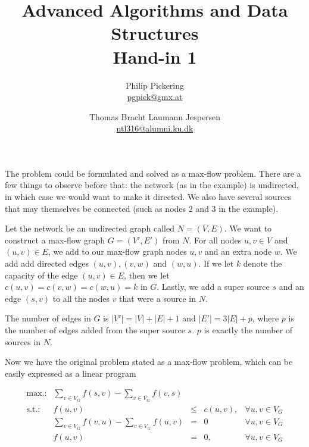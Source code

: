 \documentclass{article}
\author{Philip Pickering\\\url{pgpick@gmx.at} \and Thomas Bracht Laumann Jespersen\\\url{ntl316@alumni.ku.dk}}
\title{Advanced Algorithms and Data Structures\\Hand-in 1}
\date{}
\begin{document}
\maketitle

The problem could be formulated and solved as a max-flow
problem. There are a few things to observe before that: the network
(as in the example) is undirected, in which case we would want to make
it directed. We also have several sources that may themselves be
connected (such as nodes 2 and 3 in the example).


Let the network be an undirected graph called $N = (V,E)$. We want to
construct a max-flow graph $G = (V',E')$ from $N$. For all nodes
$u,v\in V$ and $(u,v)\in E$, we add to our max-flow 
graph nodes $u, v$ and an extra node $w$. We add add directed edges
$(u,v), (v,w)$ and $(w,u)$. If we let $k$ denote the capacity of the
edge $(u,v)\in E$, then we let $c(u,v) = c(v,w) = c(w,u) = k$ in
$G$. Lastly, we add a super source $s$ and an edge $(s,v)$ to all the
nodes $v$ that were a source in $N$.

The number of edges in $G$ is $|V'| = |V| + |E| + 1 $ and $|E'| = 3|E|
+ p$, where $p$ is the number of edges added from the super source
$s$. $p$ is exactly the number of sources in $N$.

Now we have the original problem stated as a max-flow problem, which
can be easily expressed as a linear program

\[
\begin{array}{lrcll}
\textrm{max.:} & \displaystyle\sum_{v\in V_G} f(s,v) -\displaystyle\sum_{v\in V_G} f(v,s) &     & & \\
\textrm{s.t.:} &  f(u,v)                &\leq & c(u,v),  &\forall u,v\in V_G\\
              &  \displaystyle\sum_{v\in V_G}f(v,u) -\displaystyle\sum_{v\in V_G}f(u,v)                & =   & 0 &\forall u,v\in V_G\\
              & f(u,v) & = & 0, &\forall u,v\in V_G
\end{array}
\]
\end{document}
